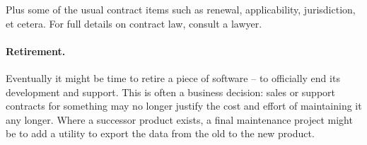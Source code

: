 Plus some of the usual contract items such as renewal, applicability, jurisdiction, et cetera. For full details on contract law, consult a lawyer.

\paragraph{Retirement.}
Eventually it might be time to retire a piece of software -- to officially end its development and support. This is often a business decision: sales or support contracts for something may no longer justify the cost and effort of maintaining it any longer. Where a successor product exists, a final maintenance project might be to add a utility to export the data from the old to the new product.





